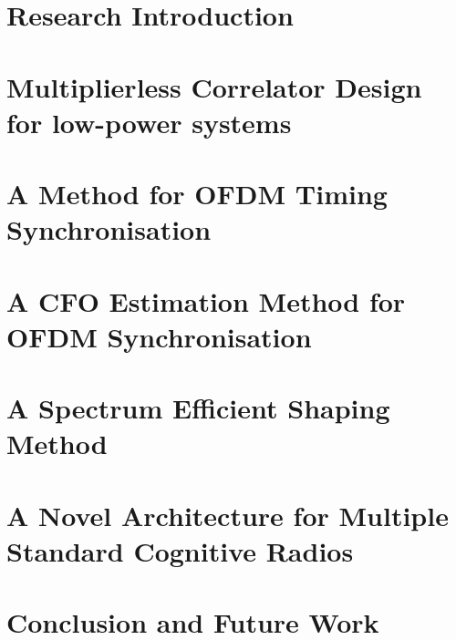 \chapter{Research Introduction}
\label{chap:introduction}

%
\chapter{Multiplierless Correlator Design for low-power systems}
\label{chap:multiplierlesscorrelator}
%
\chapter{A Method for OFDM Timing Synchronisation}
\label{chap:Synchronisation}
%
\chapter{A CFO Estimation Method for OFDM Synchronisation}
\label{chap:CFO}
%
\chapter{A Spectrum Efficient Shaping Method}
\label{chap:SpectralLeakage}
%
\chapter{A Novel Architecture for Multiple Standard Cognitive Radios}
\label{chap:MSCR}
%
\chapter{Conclusion and Future Work}
\label{chap:conclusion}





\appendix
%

\newpage
{}








